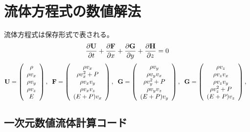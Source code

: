\chapter{ 流体方程式の数値解法}

流体方程式は保存形式で表される。
\begin{equation}
    \frac{\partial {\bf U}}{\partial t} 
    + \frac{\partial {\bf F}}{\partial x}
    + \frac{\partial {\bf G}}{\partial y}
    + \frac{\partial {\bf H}}{\partial z}=0
\end{equation}
\begin{equation}
    {\bf U} = \left( 
        \begin{array}{c}
            \rho \\
            \rho v_x \\
            \rho v_y \\
            \rho v_z \\
            E
    \end{array}
\right),\;\;
    {\bf F} = \left( 
        \begin{array}{c}
            \rho v_x \\
            \rho v_x^2 + P \\
            \rho v_x v_y \\
            \rho v_x v_z \\
            (E + P)v_x
    \end{array}
\right),\;\;
    {\bf G} = \left( 
        \begin{array}{c}
            \rho v_y \\
            \rho v_y v_x \\
            \rho v_y^2 + P \\
            \rho v_y v_z \\
            (E + P)v_y
    \end{array}
\right),\;\;
    {\bf G} = \left( 
        \begin{array}{c}
            \rho v_z \\
            \rho v_z v_x \\
            \rho v_z v_y \\
            \rho v_z^2 + P  \\
            (E + P)v_z
    \end{array}
\right),\;\;
\end{equation}

\section{一次元数値流体計算コード}

